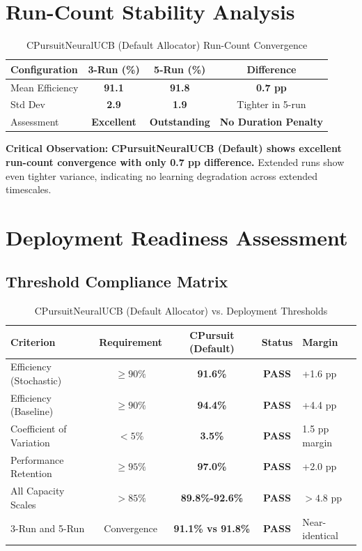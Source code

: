 \documentclass[12pt,a4paper]{article}
\newcommand{\success}[1]{\textcolor{accentgreen}{\textbf{#1}}}
\begin{document}
\section{Run-Count Stability Analysis}

\begin{table}[H]
\centering
\caption{CPursuitNeuralUCB (Default Allocator) Run-Count Convergence}
\begin{tabular}{@{}lccc@{}}
\toprule
\textbf{Configuration} & \textbf{3-Run (\%)} & \textbf{5-Run (\%)} & \textbf{Difference} \\
\midrule
Mean Efficiency & \success{91.1} & \success{91.8} & \success{0.7 pp} \\
Std Dev & \success{2.9} & \success{1.9} & Tighter in 5-run \\
Assessment & \success{Excellent} & \success{Outstanding} & \success{No Duration Penalty} \\
\bottomrule
\end{tabular}
\end{table}

\textbf{Critical Observation:} \success{CPursuitNeuralUCB (Default) shows excellent run-count convergence with only 0.7 pp difference.} Extended runs show even tighter variance, indicating no learning degradation across extended timescales.

\section{Deployment Readiness Assessment}

\subsection{Threshold Compliance Matrix}

\begin{table}[H]
\centering
\caption{CPursuitNeuralUCB (Default Allocator) vs. Deployment Thresholds}
\begin{tabular}{@{}lcccl@{}}
\toprule
\textbf{Criterion} & \textbf{Requirement} & \textbf{CPursuit (Default)} & \textbf{Status} & \textbf{Margin} \\
\midrule
Efficiency (Stochastic) & $\geq 90\%$ & \success{91.6\%} & \success{\checkmark PASS} & +1.6 pp \\
Efficiency (Baseline) & $\geq 90\%$ & \success{94.4\%} & \success{\checkmark PASS} & +4.4 pp \\
Coefficient of Variation & $< 5\%$ & \success{3.5\%} & \success{\checkmark PASS} & 1.5 pp margin \\
Performance Retention & $\geq 95\%$ & \success{97.0\%} & \success{\checkmark PASS} & +2.0 pp \\
All Capacity Scales & $> 85\%$ & \success{89.8\%-92.6\%} & \success{\checkmark PASS} & $>4.8$ pp \\
3-Run and 5-Run & Convergence & \success{91.1\% vs 91.8\%} & \success{\checkmark PASS} & Near-identical \\
\bottomrule
\end{tabular}
\end{table}
\end{document}
